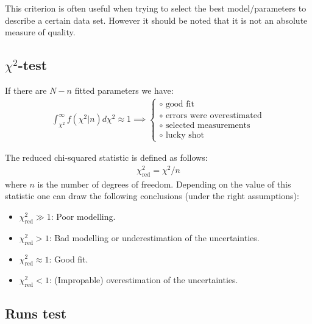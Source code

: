 {{		This criterion is often useful when trying to select the best model/parameters to describe a certain data set. However it should be noted that it is not an absolute measure of quality.
	}
	
\subsection{\texorpdfstring{$\chi^2$}{Chi squared}-test}\label{statistics:section:chi_squared_test}

        \begin{property}
        	If there are $N - n$ fitted parameters we have:
		\begin{gather}
			\label{statistics:gof:chance_for_chi_square}
                	\int_{\chi^2}^\infty f\left(\chi^2|n\right)d\chi^2 \approx 1\implies
	                \begin{cases}
				\circ\text{ good fit}\\
	                	\circ\text{ errors were overestimated}\\
	                	\circ\text{ selected measurements}\\
	                	\circ\text{ lucky shot}
        	        \end{cases}
		\end{gather}
	\end{property}
        \begin{property}
		The reduced chi-squared statistic is defined as follows:
		\begin{gather}
			\chi^2_{\text{red}} = \chi^2/n
		\end{gather}
		where $n$ is the number of degrees of freedom. Depending on the value of this statistic one can draw the following conclusions (under the right assumptions):
		\begin{itemize}
                	\item $\chi^2_{\text{red}} \gg 1$: Poor modelling.
                	\item $\chi^2_{\text{red}} > 1$: Bad modelling or underestimation of the uncertainties.
                	\item $\chi^2_{\text{red}} \approx 1$: Good fit.
                	\item $\chi^2_{\text{red}} < 1$: (Impropable) overestimation of the uncertainties. 
		\end{itemize}
	\end{property}
    
\subsection{Runs test}
	
}
